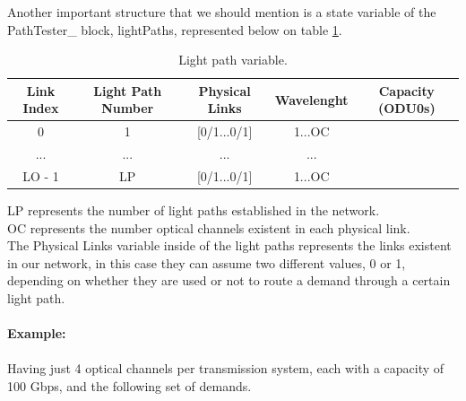 Another important structure that we should mention is a state variable of the PathTester\_  block, lightPaths, represented below on table \ref{lightpath_example}.
\begin{table}[H]
	\centering
	\begin{tabular}{|c|c|c|c|c|}
		\hline
		Link Index & Light Path Number & Physical Links  & Wavelenght & Capacity (ODU0s) \\ \hline
		0          & 1                 & {[}0/1...0/1{]} & 1...OC     &                  \\ \hline
		...        & ...               & ...             & ...        &                  \\ \hline
		LO - 1         & LP                & {[}0/1...0/1{]} & 1...OC     &                  \\ \hline
	\end{tabular}
	\caption{Light path variable.}
	\label{lightpath_example}
\end{table}
LP represents the number of light paths established in the network.\\
OC represents the number optical channels existent in each physical link.\\
The Physical Links variable inside of the light paths represents the links existent in our network, in this case they can assume two different values, 0 or 1, depending on whether they are used or not to route a demand through a certain light path.\\ \\
\clearpage
\textbf{Example:}  \\
\\
Having just 4 optical channels per transmission system, each with a capacity of 100 Gbps, and the following set of demands.

